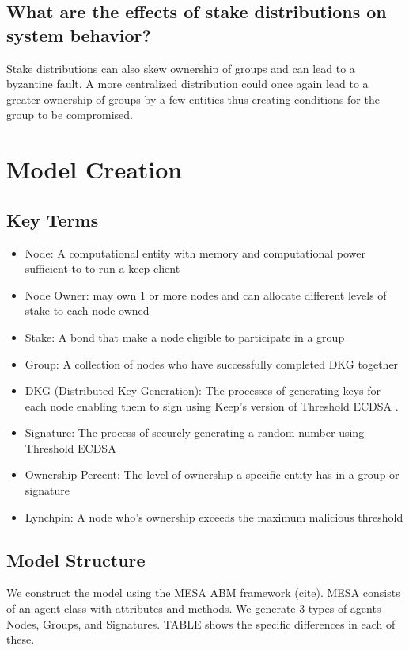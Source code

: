 \documentclass[conference]{IEEEtran}
\begin{document}
\subsection{What are the effects of stake distributions on system behavior?}
Stake distributions can also skew ownership of groups and can lead to a byzantine fault. A more
centralized distribution could once again lead to a greater ownership of groups by a few entities
thus creating conditions for the group to be compromised. 

\section{Model Creation}

\subsection{Key Terms}
\begin{itemize}
\item Node: A computational entity with memory and computational power sufficient to to run a 
keep client
    
\item Node Owner: may own 1 or more nodes and can allocate different levels of stake to each node
    owned
    
\item Stake: A bond that make a node eligible to participate in a group 
    
\item Group: A collection of nodes who have successfully completed DKG together
    
\item DKG (Distributed Key Generation): The processes of generating keys for each node enabling
    them to sign using Keep's version of Threshold ECDSA \cite{Gennaro2018}.
    
\item Signature: The process of securely generating a random number using Threshold ECDSA \cite{Gennaro2018}
    
\item Ownership Percent: The level of ownership a specific entity has in a group or signature
    
\item Lynchpin: A node who's ownership exceeds the maximum malicious threshold
\end{itemize}

\subsection{Model Structure}
We construct the model using the MESA ABM framework (cite). MESA consists of an agent class with
attributes and methods. We generate 3 types of agents Nodes, Groups, and Signatures. TABLE shows 
the specific differences in each of these.
\end{document}

